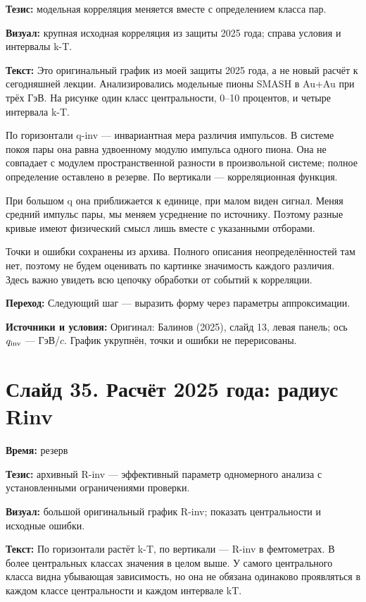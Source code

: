 \documentclass[11pt,a4paper]{article}
\begin{document}
\textbf{Тезис:} модельная корреляция меняется вместе с определением класса пар.

\textbf{Визуал:} крупная исходная корреляция из защиты 2025 года; справа условия и интервалы k-T.

\textbf{Текст:} Это оригинальный график из моей защиты 2025 года, а не новый расчёт к сегодняшней лекции. Анализировались модельные пионы SMASH в Au+Au при трёх ГэВ. На рисунке один класс центральности, 0–10 процентов, и четыре интервала k-T.

По горизонтали q-inv — инвариантная мера различия импульсов. В системе покоя пары она равна удвоенному модулю импульса одного пиона. Она не совпадает с модулем пространственной разности в произвольной системе; полное определение оставлено в резерве. По вертикали — корреляционная функция.

При большом q она приближается к единице, при малом виден сигнал. Меняя средний импульс пары, мы меняем усреднение по источнику. Поэтому разные кривые имеют физический смысл лишь вместе с указанными отборами.

Точки и ошибки сохранены из архива. Полного описания неопределённостей там нет, поэтому не будем оценивать по картинке значимость каждого различия. Здесь важно увидеть всю цепочку обработки от событий к корреляции.

\textbf{Переход:} Следующий шаг — выразить форму через параметры аппроксимации.

\textbf{Источники и условия:} Оригинал: Балинов (2025), слайд 13, левая панель; ось \(q_{\rm inv}\) — ГэВ/\(c\). График укрупнён, точки и ошибки не перерисованы.

\clearpage
\section*{Слайд 35. Расчёт 2025 года: радиус Rinv}
\textbf{Время:} резерв

\textbf{Тезис:} архивный R-inv — эффективный параметр одномерного анализа с установленными ограничениями проверки.

\textbf{Визуал:} большой оригинальный график R-inv; показать центральности и исходные ошибки.

\textbf{Текст:} По горизонтали растёт k-T, по вертикали — R-inv в фемтометрах. В более центральных классах значения в целом выше. У самого центрального класса видна убывающая зависимость, но она не обязана одинаково проявляться в каждом классе центральности и каждом интервале kT.
\end{document}
